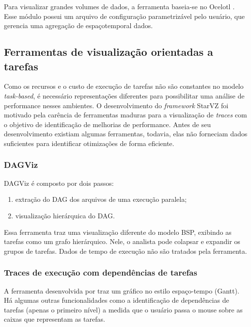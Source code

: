 \documentclass[prop-esp]{iiufrgs}
\begin{document}
Para visualizar grandes volumes de dados, a ferramenta baseia-se no Ocelotl \cite{ref:ocelotl}. Esse módulo possui um arquivo de configuração parametrizável pelo usuário, que gerencia uma agregação de espaçotemporal dados.

\subsection*{Ferramentas de visualização orientadas a tarefas}

Como os recursos e o custo de execução de tarefas não são constantes no modelo \emph{task-based}, é necessário representações diferentes para
possibilitar uma análise de performance nesses ambientes. O desenvolvimento do \emph{framework} StarVZ \cite{ref:starvz} foi motivado pela carência
de ferramentas maduras para a visualização de \emph{traces} com o objetivo de identificação de melhorias de performance. Antes de seu desenvolvimento existiam algumas ferramentas, todavia, elas não forneciam dados suficientes para identificar otimizações de forma eficiente.

\subsubsection*{DAGViz}

DAGViz \cite{ref:dagviz} é composto por dois passos: 

\begin{enumerate}
    \item extração do DAG dos arquivos de uma execução paralela;
    \item visualização hierárquica do DAG.
\end{enumerate}

Essa ferramenta traz uma visualização diferente do modelo BSP, exibindo as tarefas como um grafo hierárquico. Nele, o analista pode colapsar e expandir os grupos de tarefas. Dados de tempo de execução não são tratados pela ferramenta.

\subsubsection*{Traces de execução com dependências de tarefas}

A ferramenta desenvolvida por \citet{ref:visuexecdep} traz um gráfico no estilo espaço-tempo (Gantt). Há algumas outras funcionalidades como a identificação de dependências de tarefas (apenas o primeiro nível) a medida que o usuário passa o mouse sobre as caixas que representam as tarefas.
\end{document}
